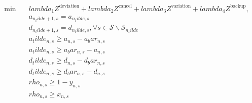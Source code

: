 \begin{align}
  \min\quad & \mathit{lambda}_{1} Z^{\text{deviation}} + \mathit{lambda}_{2} Z^{\text{cancel}} + \mathit{lambda}_{3} Z^{\text{variation}} + \mathit{lambda}_{4} Z^{\text{backup}} , \tag{eq\_0103} \\
  & a_{n_tilde + 1 , s} = a_{n_tilde , s} \tag{eq\_0096\_a} \\
  & d_{n_tilde + 1 , s} = d_{n_tilde , s} , \forall s \in \mathcal{S} \backslash \mathcal{S}_{n_tilde} \tag{eq\_0096\_b} \\
  & a_tilde_{n , s} \geq a_{n , s} - a_bar_{n , s} \tag{eq\_0116\_b} \\
  & a_tilde_{n , s} \geq a_bar_{n , s} - a_{n , s} \tag{eq\_0116\_c} \\
  & d_tilde_{n , s} \geq d_{n , s} - d_bar_{n , s} \tag{eq\_0116\_d} \\
  & d_tilde_{n , s} \geq d_bar_{n , s} - d_{n , s} \tag{eq\_0116\_e} \\
  & \mathit{rho}_{n , s} \geq 1 - y_{n , s} \tag{eq\_0117\_b} \\
  & \mathit{rho}_{n , s} \geq x_{n , s} \tag{eq\_0117\_c} \\
\end{align}

